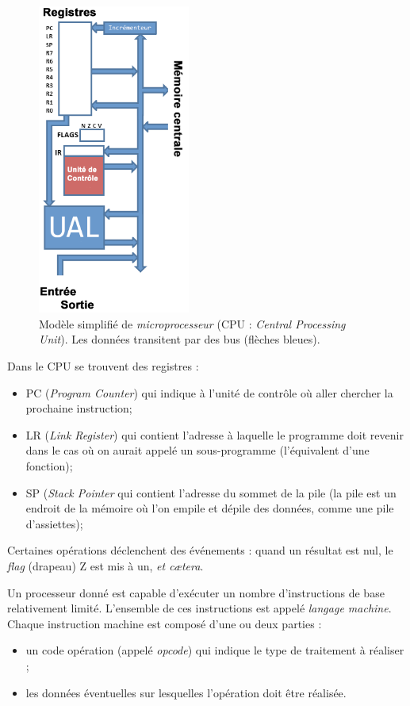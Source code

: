 \begin{figure}[H]
    \begin{center}
        \includegraphics[width=5cm]{img/vn2.png}
    \end{center}
    \caption*{Modèle simplifié de \textit{microprocesseur} (CPU : \textit{Central Processing Unit}).
        Les données transitent par des bus (flèches bleues).}
\end{figure}



Dans le CPU se trouvent des registres :
\begin{itemize}
    \item 	PC (\textit{Program Counter}) qui indique à l'unité de contrôle où aller chercher la prochaine instruction;
    \item 	LR	(\textit{Link Register}) qui contient l'adresse à laquelle le programme doit revenir dans le cas où on aurait appelé un sous-programme (l'équivalent d'une fonction);
    \item 	SP (\textit{Stack Pointer} qui contient l'adresse du sommet de la pile (la pile est un endroit de la mémoire où l'on \og empile\fg{} et \og dépile\fg{} des données, comme une pile d'assiettes);
\end{itemize}
Certaines opérations déclenchent des \og événements\fg{} : quand un résultat est nul, le \textit{flag} (drapeau) Z est mis à un, \textit{et c\ae tera}.

Un processeur donné est capable d'exécuter un nombre d'instructions de base relativement limité. L'ensemble de ces instructions est appelé \textit{langage machine}. Chaque instruction machine est composé d'une ou deux parties :
\begin{itemize}
    \item 	un code opération (appelé \textit{opcode}) qui indique le type de traitement à réaliser ;
    \item 	les données éventuelles sur lesquelles l'opération doit être réalisée.
\end{itemize}

